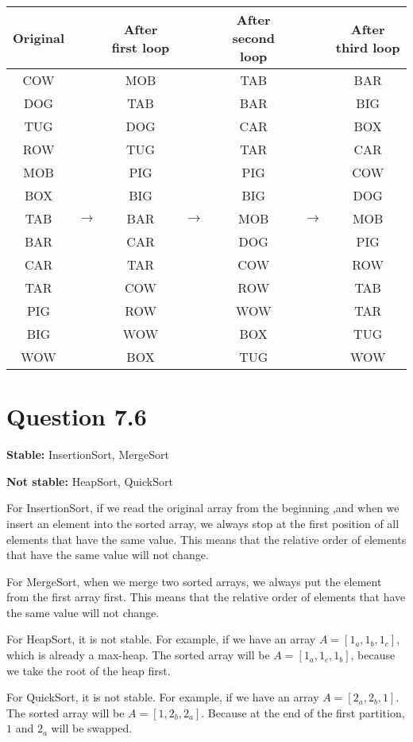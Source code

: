 \documentclass[a4paper,12pt]{article}
\begin{document}
\begin{center}
	\begin{tabular}{ccccccc}
		\toprule
		Original & & After first loop & & After second loop & & After third loop \\
		\midrule
		COW & & MOB & & TAB & & BAR \\ 
        DOG & & TAB & & BAR & & BIG \\ 
        TUG & & DOG & & CAR & & BOX \\ 
        ROW & & TUG & & TAR & & CAR \\ 
        MOB & & PIG & & PIG & & COW \\ 
        BOX & & BIG & & BIG & & DOG \\ 
        TAB & $\rightarrow$ & BAR & $\rightarrow$ & MOB & $\rightarrow$ & MOB \\ 
        BAR & & CAR & & DOG & & PIG \\ 
        CAR & & TAR & & COW & & ROW \\ 
        TAR & & COW & & ROW & & TAB \\ 
        PIG & & ROW & & WOW & & TAR \\ 
        BIG & & WOW & & BOX & & TUG \\ 
        WOW & & BOX & & TUG & & WOW \\ 
		\bottomrule
	\end{tabular}
\end{center}

\section*{Question 7.6}

\textbf{Stable:}
InsertionSort, MergeSort

\textbf{Not stable:}
HeapSort, QuickSort

For InsertionSort, if we read the original array from the beginning ,and when we insert an element into the sorted array, we always stop at the first position of all elements that have the same value.
This means that the relative order of elements that have the same value will not change.

For MergeSort, when we merge two sorted arrays, we always put the element from the first array first.
This means that the relative order of elements that have the same value will not change.

For HeapSort, it is not stable. 
For example, if we have an array $A = [1_a,1_b,1_c]$, which is already a max-heap.
The sorted array will be $A = [1_a,1_c,1_b]$, because we take the root of the heap first.

For QuickSort, it is not stable.
For example, if we have an array $A = [2_a,2_b,1]$.
The sorted array will be $A = [1,2_b,2_a]$.
Because at the end of the first partition, $1$ and $2_a$ will be swapped.
\end{document}
